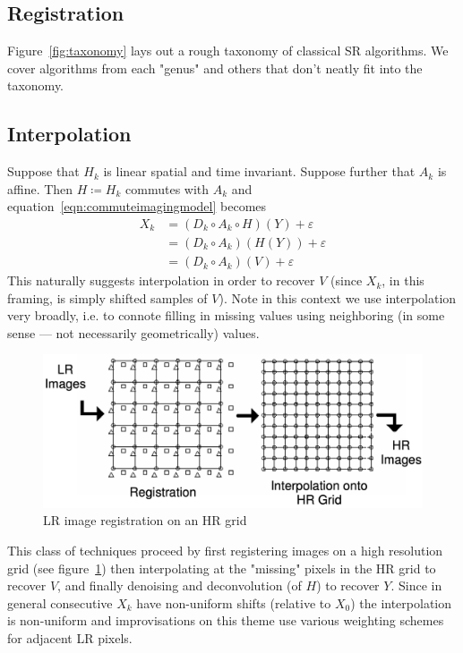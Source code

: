\subsection{Registration}

Figure~\ref{fig:taxonomy} lays out a rough taxonomy of classical SR algorithms.
%
We cover algorithms from each "genus" and others that don't neatly fit into the taxonomy.
\subsection{Interpolation}
Suppose that $H_k$ is linear spatial and time invariant.
%
Suppose further that $A_k$ is affine.
%
Then $H \coloneqq H_k$ commutes with $A_k$\cite{meladcommute} and equation~\ref{eqn:commuteimagingmodel} becomes
\begin{equation}
    \label{eqn:commuteimagingmodel}
    \begin{split}
        X_k &= (D_k \circ A_k \circ H) (Y) + \varepsilon \\
        &= (D_k \circ A_k) (H(Y)) + \varepsilon \\
        &= (D_k \circ A_k) (V) + \varepsilon
    \end{split}
\end{equation}
This naturally suggests interpolation in order to recover $V$ (since $X_k$, in this framing, is simply shifted samples of $V$).
%
Note in this context we use interpolation very broadly, i.e. to connote filling in missing values using neighboring (in some sense --- not necessarily geometrically) values.
%
\begin{figure}
    \centering
    \includegraphics[width=\linewidth]{figures/hrgrid.png}
    \caption{LR image registration on an HR grid\cite{Lin}}
    \label{fig:hrgrid}
\end{figure}
This class of techniques proceed by first registering images on a high resolution grid (see figure~\ref{fig:hrgrid}) then interpolating at the "missing" pixels in the HR grid to recover $V$, and finally denoising and deconvolution (of $H$) to recover $Y$.
%
Since in general consecutive $X_k$ have non-uniform shifts (relative to $X_0$) the interpolation is non-uniform and improvisations on this theme use various weighting schemes for adjacent LR pixels.

